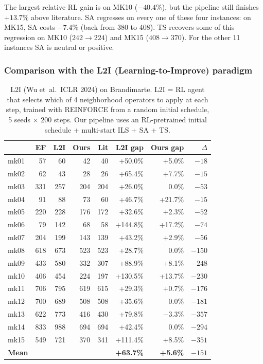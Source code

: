 \documentclass[10pt]{article}
\theoremstyle{definition}
\newcommand{\etal}{et~al.\!}
\begin{document}
The largest relative RL gain is on MK10 ($-40.4\%$), but
the pipeline still finishes $+13.7\%$ above literature.
SA regresses on every one of these four instances: on
MK15, SA costs $-7.4\%$ (back from 380 to 408). TS recovers
some of this regression on MK10 ($242 \to 224$) and MK15
($408 \to 370$). For the other 11 instances SA is neutral
or positive.

\subsubsection{Comparison with the L2I (Learning-to-Improve) paradigm}

\begin{table}[h]
\centering
\caption{L2I (Wu \etal\ ICLR 2024) on Brandimarte.
L2I = RL agent that selects which of 4 neighborhood
operators to apply at each step, trained with REINFORCE
from a random initial schedule, 5 seeds $\times$ 200 steps.
Our pipeline uses an RL-pretrained initial schedule
+ multi-start ILS + SA + TS.}
\label{tab:l2i}
\small
\begin{tabular}{lrrrrrrr}
\toprule
& \textbf{EF} & \textbf{L2I} & \textbf{Ours} & \textbf{Lit} & \textbf{L2I gap} & \textbf{Ours gap} & $\Delta$ \\
\midrule
mk01 & 57  & 60  & 42  & 40  & +50.0\% & +5.0\%  & $-18$ \\
mk02 & 62  & 43  & 28  & 26  & +65.4\% & +7.7\%  & $-15$ \\
mk03 & 331 & 257 & 204 & 204 & +26.0\% & 0.0\%   & $-53$ \\
mk04 & 91  & 88  & 73  & 60  & +46.7\% & +21.7\% & $-15$ \\
mk05 & 220 & 228 & 176 & 172 & +32.6\% & +2.3\%  & $-52$ \\
mk06 & 79  & 142 & 68  & 58  & +144.8\% & +17.2\% & $-74$ \\
mk07 & 204 & 199 & 143 & 139 & +43.2\% & +2.9\%  & $-56$ \\
mk08 & 618 & 673 & 523 & 523 & +28.7\% & 0.0\%   & $-150$ \\
mk09 & 433 & 580 & 332 & 307 & +88.9\% & +8.1\%  & $-248$ \\
mk10 & 406 & 454 & 224 & 197 & +130.5\% & +13.7\% & $-230$ \\
mk11 & 706 & 795 & 619 & 615 & +29.3\% & +0.7\%  & $-176$ \\
mk12 & 700 & 689 & 508 & 508 & +35.6\% & 0.0\%   & $-181$ \\
mk13 & 622 & 773 & 416 & 430 & +79.8\% & $-3.3\%$ & $-357$ \\
mk14 & 833 & 988 & 694 & 694 & +42.4\% & 0.0\%   & $-294$ \\
mk15 & 549 & 721 & 370 & 341 & +111.4\% & +8.5\%  & $-351$ \\
\midrule
\textbf{Mean} & & & & & \textbf{+63.7\%} & \textbf{+5.6\%} & $-151$ \\
\bottomrule
\end{tabular}
\end{table}
\end{document}
